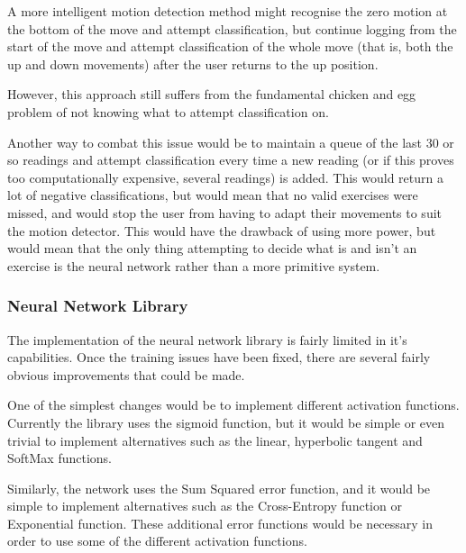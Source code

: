 \documentclass[a4paper]{article}
\begin{document}

A more intelligent motion detection method might recognise the zero motion at the bottom of the move and attempt classification, but continue logging from the start of the move and attempt classification of the whole move (that is, both the up and down movements) after the user returns to the up position.


However, this approach still suffers from the fundamental chicken and egg problem of not knowing what to attempt classification on.

Another way to combat this issue would be to maintain a queue of the last 30 or so readings and attempt classification every time a new reading (or if this proves too computationally expensive, several readings) is added. 
This would return a lot of negative classifications, but would mean that no valid exercises were missed, and would stop the user from having to adapt their movements to suit the motion detector. This would have the drawback of using more power, but would mean that the only thing attempting to decide what is and isn't an exercise is the neural network rather than a more primitive system.


\subsubsection{Neural Network Library}

The implementation of the neural network library is fairly limited in it's capabilities. Once the training issues have been fixed, there are several fairly obvious improvements that could be made.

One of the simplest changes would be to implement different activation functions. Currently the library uses the sigmoid function, but it would be simple or even trivial to implement alternatives such as the linear, hyperbolic tangent and SoftMax functions.

Similarly, the network uses the Sum Squared error function, and it would be simple to implement alternatives such as the Cross-Entropy function or Exponential function. These additional error functions would be necessary in order to use some of the different activation functions. 
\end{document}
